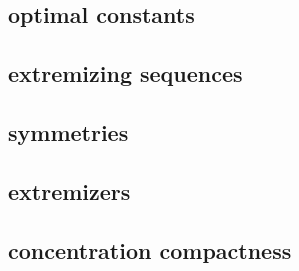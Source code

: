 

\subsection{optimal constants}
\label{b2:subsec:230501}

\subsection{extremizing sequences}
\label{b2:subsec:230502}

\subsection{symmetries}
\label{b2:subsec:230503}

\subsection{extremizers}
\label{b2:subsec:230504}

\subsection{concentration compactness}
\label{b2:subsec:230505}


